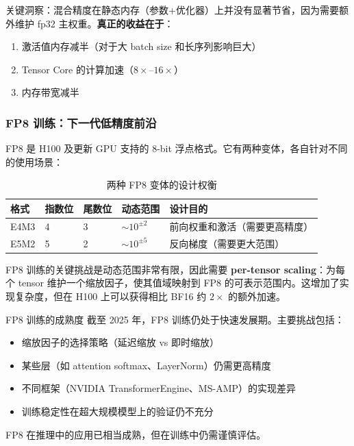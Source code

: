 \documentclass[a4paper]{article}
\begin{document}
关键洞察：混合精度在静态内存（参数+优化器）上并没有显著节省，因为需要额外维护 fp32 主权重。\textbf{真正的收益在于}：
\begin{enumerate}
    \item 激活值内存减半（对于大 batch size 和长序列影响巨大）
    \item Tensor Core 的计算加速（$8\times$--$16\times$）
    \item 内存带宽减半
\end{enumerate}

\subsubsection{FP8 训练：下一代低精度前沿}

FP8 是 H100 及更新 GPU 支持的 8-bit 浮点格式。它有两种变体，各自针对不同的使用场景：

\begin{table}[H]
\centering
\begin{tabular}{p{}p{}p{}p{}p{}}
\toprule
\textbf{格式} & \textbf{指数位} & \textbf{尾数位} & \textbf{动态范围} & \textbf{设计目的} \\
\midrule
E4M3 & 4 & 3 & $\sim 10^{\pm 2}$ & 前向权重和激活（需要更高精度） \\
E5M2 & 5 & 2 & $\sim 10^{\pm 5}$ & 反向梯度（需要更大范围） \\
\bottomrule
\end{tabular}
\caption{两种 FP8 变体的设计权衡}
\end{table}

FP8 训练的关键挑战是动态范围非常有限，因此需要 \textbf{per-tensor scaling}：为每个 tensor 维护一个缩放因子，使其值域映射到 FP8 的可表示范围内。这增加了实现复杂度，但在 H100 上可以获得相比 BF16 约 $2\times$ 的额外加速。

\begin{warningbox}{FP8 训练的成熟度}
截至 2025 年，FP8 训练仍处于快速发展期。主要挑战包括：
\begin{itemize}
    \item 缩放因子的选择策略（延迟缩放 vs 即时缩放）
    \item 某些层（如 attention softmax、LayerNorm）仍需更高精度
    \item 不同框架（NVIDIA TransformerEngine、MS-AMP）的实现差异
    \item 训练稳定性在超大规模模型上的验证仍不充分
\end{itemize}
FP8 在推理中的应用已相当成熟，但在训练中仍需谨慎评估。
\end{warningbox}
\end{document}
